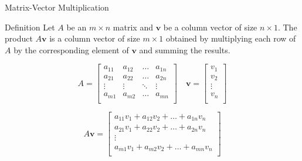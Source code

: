 \documentclass{beamer}
\begin{document}
\begin{frame}{Matrix-Vector Multiplication}

  \begin{block}{Definition}
    Let \(A\) be an \(m \times n\) matrix and \(\mathbf{v}\) be a column vector of size \(n \times 1\). The product \(A\mathbf{v}\) is a column vector of size \(m \times 1\) obtained by multiplying each row of \(A\) by the corresponding element of \(\mathbf{v}\) and summing the results.

    \[
      A = \begin{bmatrix}
        a_{11} & a_{12} & \ldots & a_{1n} \\
        a_{21} & a_{22} & \ldots & a_{2n} \\
        \vdots & \vdots & \ddots & \vdots \\
        a_{m1} & a_{m2} & \ldots & a_{mn} \\
      \end{bmatrix}
      \quad
      \mathbf{v} = \begin{bmatrix}
        v_1 \\
        v_2 \\
        \vdots \\
        v_n \\
      \end{bmatrix}
    \]

    \[
      A\mathbf{v} = \begin{bmatrix}
        a_{11}v_1 + a_{12}v_2 + \ldots + a_{1n}v_n \\
        a_{21}v_1 + a_{22}v_2 + \ldots + a_{2n}v_n \\
        \vdots \\
        a_{m1}v_1 + a_{m2}v_2 + \ldots + a_{mn}v_n \\
      \end{bmatrix}
    \]
  \end{block}
    



\end{frame}
\end{document}
